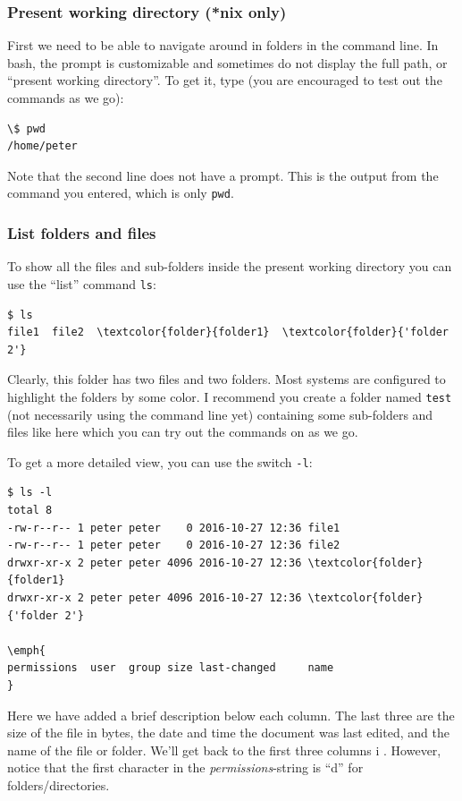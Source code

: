\subsubsection{Present working directory (*nix only)}
First we need to be able to navigate around in folders in the command line. In bash, the prompt is customizable and sometimes do not display the full path, or ``present working directory''. To get it, type (you are encouraged to test out the commands as we go):

\begin{Verbatim}[commandchars=\\\{\}]
\$ pwd
/home/peter
\end{Verbatim}
Note that the second line does not have a prompt. This is the output from the command you entered, which is only \verb|pwd|. 

\subsubsection{List folders and files}\label{sec:bash:ls}
To show all the files and sub-folders inside the present working directory you can use the ``list'' command \verb|ls|:

\begin{Verbatim}[commandchars=\\\{\}]
$ ls
file1  file2  \textcolor{folder}{folder1}  \textcolor{folder}{'folder 2'}
\end{Verbatim}
\ignore{$}
Clearly, this folder has two files and two folders. Most systems are configured to highlight the folders by some color. I recommend you create a folder named \verb|test| (not necessarily using the command line yet) containing some sub-folders and files like here which you can try out the commands on as we go.

To get a more detailed view, you can use the switch \verb|-l|:

\begin{Verbatim}[commandchars=\\\{\}]
$ ls -l
total 8
-rw-r--r-- 1 peter peter    0 2016-10-27 12:36 file1
-rw-r--r-- 1 peter peter    0 2016-10-27 12:36 file2
drwxr-xr-x 2 peter peter 4096 2016-10-27 12:36 \textcolor{folder}{folder1}
drwxr-xr-x 2 peter peter 4096 2016-10-27 12:36 \textcolor{folder}{'folder 2'}

\emph{
permissions  user  group size last-changed     name
}
\end{Verbatim}
\ignore{$}
Here we have added a brief description below each column. The last three are the size of the file in bytes, the date and time the document was last edited, and the name of the file or folder. We'll get back to the first three columns i . However, notice that the first character in the \emph{permissions}-string is ``d'' for folders/directories.

